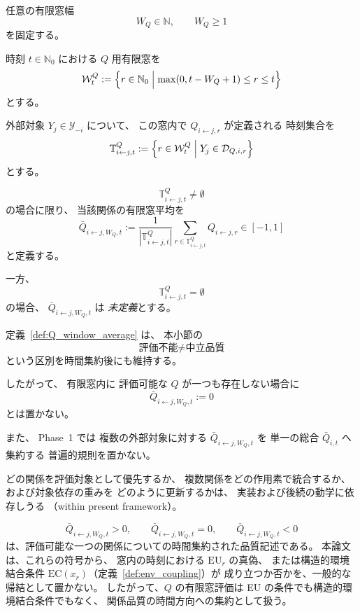 \begin{definition}[関係品質の有限窓評価]
\label{def:Q_window_average}
任意の有限窓幅
\[
  W_Q\in\mathbb{N},
  \qquad
  W_Q\ge1
\]
を固定する。

時刻 $t\in\mathbb{N}_0$ における
$Q$ 用有限窓を
\[
  \mathcal{W}_t^{Q}
  :=
  \Bigl\{
    r\in\mathbb{N}_0
    \Bigm|
    \max(0,t-W_Q+1)\le r\le t
  \Bigr\}
\]
とする。

外部対象
$Y_j\in\mathcal{Y}_{-i}$
について、
この窓内で
$Q_{i\leftarrow j,r}$ が定義される
時刻集合を
\[
  \mathbb T^{Q}_{i\leftarrow j,t}
  :=
  \Bigl\{
    r\in\mathcal{W}_t^{Q}
    \Bigm|
    Y_j\in\mathcal D_{Q,i,r}
  \Bigr\}
\]
とする。

\[
  \mathbb T^{Q}_{i\leftarrow j,t}\neq\emptyset
\]
の場合に限り、
当該関係の有限窓平均を
\[
  \bar Q_{i\leftarrow j,W_Q,t}
  :=
  \frac{1}{|\mathbb T^{Q}_{i\leftarrow j,t}|}
  \sum_{r\in\mathbb T^{Q}_{i\leftarrow j,t}}
  Q_{i\leftarrow j,r}
  \in[-1,1]
\]
と定義する。

一方、
\[
  \mathbb T^{Q}_{i\leftarrow j,t}=\emptyset
\]
の場合、
$\bar Q_{i\leftarrow j,W_Q,t}$ は
\emph{未定義}とする。
\end{definition}

\begin{remark}
\label{rem:Q_window_undefined}
定義~\ref{def:Q_window_average} は、
本小節の
\[
  \text{評価不能}
  \neq
  \text{中立品質}
\]
という区別を時間集約後にも維持する。

したがって、
有限窓内に
評価可能な $Q$ が一つも存在しない場合に
\[
  \bar Q_{i\leftarrow j,W_Q,t}:=0
\]
とは置かない。

また、
Phase~1 では
複数の外部対象に対する
$\bar Q_{i\leftarrow j,W_Q,t}$ を
単一の総合 $\bar Q_{i,t}$ へ集約する
普遍的規則を置かない。

どの関係を評価対象として優先するか、
複数関係をどの作用素で統合するか、
および対象依存の重みを
どのように更新するかは、
実装および後続の動学に依存しうる
（within present framework）。
\end{remark}

\begin{remark}
\label{rem:Q_window_not_RO}
\[
  \bar Q_{i\leftarrow j,W_Q,t}>0,
  \qquad
  \bar Q_{i\leftarrow j,W_Q,t}=0,
  \qquad
  \bar Q_{i\leftarrow j,W_Q,t}<0
\]
は、評価可能な一つの関係についての時間集約された品質記述である。
本論文は、これらの符号から、
窓内の時刻における $\mathrm{EU}_r$ の真偽、
または構造的環境結合条件 $\mathrm{EC}(x_r)$（定義~\ref{def:env_coupling}）が
成り立つか否かを、一般的な帰結として置かない。
したがって、$Q$ の有限窓評価は EU の条件でも構造的環境結合条件でもなく、
関係品質の時間方向への集約として扱う。
\end{remark}

